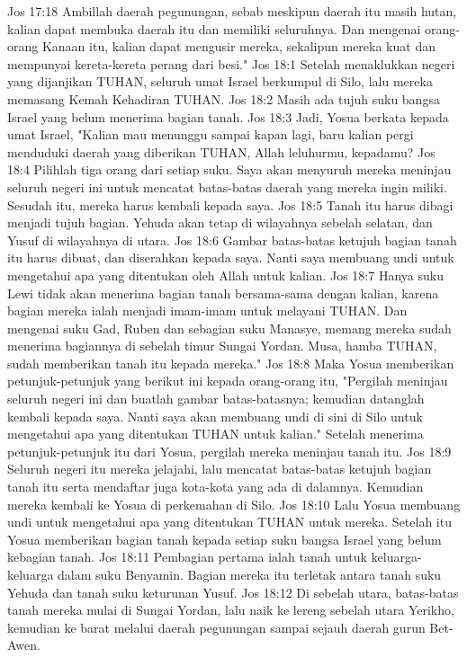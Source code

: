 Jos 17:18  Ambillah daerah pegunungan, sebab meskipun daerah itu masih hutan, kalian dapat membuka daerah itu dan memiliki seluruhnya. Dan mengenai orang-orang Kanaan itu, kalian dapat mengusir mereka, sekalipun mereka kuat dan mempunyai kereta-kereta perang dari besi."
Jos 18:1  Setelah menaklukkan negeri yang dijanjikan TUHAN, seluruh umat Israel berkumpul di Silo, lalu mereka memasang Kemah Kehadiran TUHAN.
Jos 18:2  Masih ada tujuh suku bangsa Israel yang belum menerima bagian tanah.
Jos 18:3  Jadi, Yosua berkata kepada umat Israel, "Kalian mau menunggu sampai kapan lagi, baru kalian pergi menduduki daerah yang diberikan TUHAN, Allah leluhurmu, kepadamu?
Jos 18:4  Pilihlah tiga orang dari setiap suku. Saya akan menyuruh mereka meninjau seluruh negeri ini untuk mencatat batas-batas daerah yang mereka ingin miliki. Sesudah itu, mereka harus kembali kepada saya.
Jos 18:5  Tanah itu harus dibagi menjadi tujuh bagian. Yehuda akan tetap di wilayahnya sebelah selatan, dan Yusuf di wilayahnya di utara.
Jos 18:6  Gambar batas-batas ketujuh bagian tanah itu harus dibuat, dan diserahkan kepada saya. Nanti saya membuang undi untuk mengetahui apa yang ditentukan oleh Allah untuk kalian.
Jos 18:7  Hanya suku Lewi tidak akan menerima bagian tanah bersama-sama dengan kalian, karena bagian mereka ialah menjadi imam-imam untuk melayani TUHAN. Dan mengenai suku Gad, Ruben dan sebagian suku Manasye, memang mereka sudah menerima bagiannya di sebelah timur Sungai Yordan. Musa, hamba TUHAN, sudah memberikan tanah itu kepada mereka."
Jos 18:8  Maka Yosua memberikan petunjuk-petunjuk yang berikut ini kepada orang-orang itu, "Pergilah meninjau seluruh negeri ini dan buatlah gambar batas-batasnya; kemudian datanglah kembali kepada saya. Nanti saya akan membuang undi di sini di Silo untuk mengetahui apa yang ditentukan TUHAN untuk kalian." Setelah menerima petunjuk-petunjuk itu dari Yosua, pergilah mereka meninjau tanah itu.
Jos 18:9  Seluruh negeri itu mereka jelajahi, lalu mencatat batas-batas ketujuh bagian tanah itu serta mendaftar juga kota-kota yang ada di dalamnya. Kemudian mereka kembali ke Yosua di perkemahan di Silo.
Jos 18:10  Lalu Yosua membuang undi untuk mengetahui apa yang ditentukan TUHAN untuk mereka. Setelah itu Yosua memberikan bagian tanah kepada setiap suku bangsa Israel yang belum kebagian tanah.
Jos 18:11  Pembagian pertama ialah tanah untuk keluarga-keluarga dalam suku Benyamin. Bagian mereka itu terletak antara tanah suku Yehuda dan tanah suku keturunan Yusuf.
Jos 18:12  Di sebelah utara, batas-batas tanah mereka mulai di Sungai Yordan, lalu naik ke lereng sebelah utara Yerikho, kemudian ke barat melalui daerah pegunungan sampai sejauh daerah gurun Bet-Awen.
